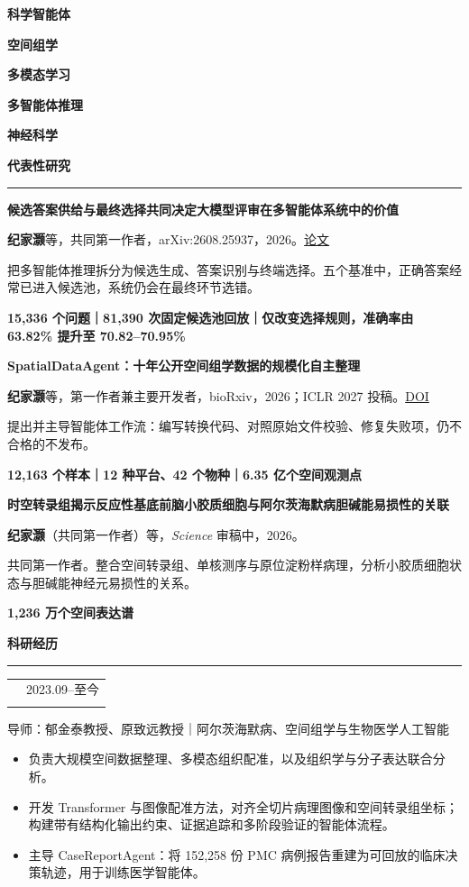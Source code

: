 \documentclass[UTF8,10pt,a4paper,fontset=fandol]{ctexart}
\makeatletter
\newcommand{\sectiontitle}[1]{%
  \vspace{0.46em}%
  {\fontsize{10.5}{11.4}\selectfont\bfseries\color{Navy}#1}\par
  \vspace{-0.22em}\color{Rule}\rule{\linewidth}{0.45pt}\color{Ink}\vspace{0.24em}
}
\newcommand{\smallmeta}[1]{{\fontsize{7.55}{8.95}\selectfont\color{Muted}#1}}
\newcommand{\pubentry}[4]{%
  {\fontsize{8.55}{9.9}\selectfont\bfseries\color{Ink}\RaggedRight #1}\par
  \smallmeta{#2}\par
  \vspace{0.05em}
  {\fontsize{7.85}{9.25}\selectfont\RaggedRight #3}\par
  \vspace{0.04em}
  {\fontsize{7.55}{8.9}\selectfont\bfseries\color{Teal}#4}\par
  \vspace{0.30em}
}
\newcommand{\role}[3]{%
  \begin{tabularx}{\linewidth}{@{}>{\RaggedRight\arraybackslash}X>{\RaggedLeft\arraybackslash}p{23mm}@{}}
    {\fontsize{8.35}{9.6}\selectfont\bfseries\color{Ink}#1} & {\fontsize{7.45}{8.7}\selectfont\color{Muted}#3}\\[-0.08em]
    {\fontsize{7.8}{9.0}\selectfont\color{Teal}#2} &
  \end{tabularx}\vspace{0.02em}
}
\newenvironment{compactitems}{%
  \begin{itemize}[leftmargin=1.05em,itemsep=0.06em,topsep=0.06em,parsep=0pt,partopsep=0pt,label=\textcolor{Teal}{\raisebox{0.18ex}{\tiny\textbullet}}]
  \fontsize{7.75}{9.15}\selectfont\RaggedRight
}{\end{itemize}}
\newcommand{\tag}[1]{\colorbox{SoftBlue}{\strut\hspace{0.26em}\fontsize{7.0}{8.1}\selectfont\bfseries\color{Navy}#1\hspace{0.26em}}}
\makeatother
\begin{document}
\tag{科学智能体}\hspace{0.30em}
\tag{空间组学}\hspace{0.30em}
\tag{多模态学习}\hspace{0.30em}
\tag{多智能体推理}\hspace{0.30em}
\tag{神经科学}

\vspace{0.12em}

\begin{minipage}[t]{0.665\textwidth}
\vspace{0pt}\RaggedRight

\sectiontitle{代表性研究}

\pubentry
{候选答案供给与最终选择共同决定大模型评审在多智能体系统中的价值}
{\textbf{纪家灏}等，共同第一作者，arXiv:2608.25937，2026。\href{https://arxiv.org/abs/2608.25937}{论文}}
{把多智能体推理拆分为候选生成、答案识别与终端选择。五个基准中，正确答案经常已进入候选池，系统仍会在最终环节选错。}
{15,336 个问题｜81,390 次固定候选池回放｜仅改变选择规则，准确率由 63.82\% 提升至 70.82--70.95\%}

\pubentry
{SpatialDataAgent：十年公开空间组学数据的规模化自主整理}
{\textbf{纪家灏}等，第一作者兼主要开发者，bioRxiv，2026；ICLR 2027 投稿。\href{https://doi.org/10.64898/2026.05.27.727615}{DOI}}
{提出并主导智能体工作流：编写转换代码、对照原始文件校验、修复失败项，仍不合格的不发布。}
{12,163 个样本｜12 种平台、42 个物种｜6.35 亿个空间观测点}

\pubentry
{时空转录组揭示反应性基底前脑小胶质细胞与阿尔茨海默病胆碱能易损性的关联}
{\textbf{纪家灏}（共同第一作者）等，\textit{Science} 审稿中，2026。}
{共同第一作者。整合空间转录组、单核测序与原位淀粉样病理，分析小胶质细胞状态与胆碱能神经元易损性的关系。}
{1,236 万个空间表达谱}

\sectiontitle{科研经历}

\role{科研项目负责人}{复旦大学数据驱动未来创新实验室｜医学遗传研究院}{2023.09--至今}
\smallmeta{导师：郁金泰教授、原致远教授｜阿尔茨海默病、空间组学与生物医学人工智能}
\begin{compactitems}
  \item 负责大规模空间数据整理、多模态组织配准，以及组织学与分子表达联合分析。
  \item 开发 Transformer 与图像配准方法，对齐全切片病理图像和空间转录组坐标；构建带有结构化输出约束、证据追踪和多阶段验证的智能体流程。
  \item 主导 CaseReportAgent：将 152,258 份 PMC 病例报告重建为可回放的临床决策轨迹，用于训练医学智能体。
\end{compactitems}


\end{minipage}
\end{document}
